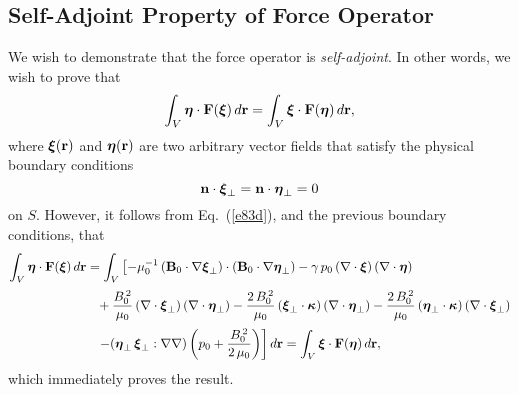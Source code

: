 \documentclass[12pt,prb,aps,notitlepage]{revtex4-1}
\newcommand{\bxi}{\mbox{\boldmath$\xi$}}
\newcommand{\bta}{\mbox{\boldmath$\eta$}}
\newcommand{\bkappa}{\mbox{\boldmath$\kappa$}}
\begin{document}
\subsection{Self-Adjoint Property of Force Operator}
We wish to demonstrate that the force operator is {\em self-adjoint}. In other words, we wish to prove that 
\begin{equation}\label{e26}
\int_V \bta\cdot{\bf F}(\bxi)\,d{\bf r} = \int_V \bxi\cdot {\bf F}(\bta)\,d{\bf r},
\end{equation}
where  $\bxi({\bf r})$ and $\bta({\bf r})$ are two arbitrary vector fields that satisfy the 
physical boundary conditions
\begin{equation}\label{e27}
{\bf n}\cdot\bxi_\perp={\bf n}\cdot\bta_\perp=0
\end{equation}
on $S$.
However, it follows from Eq.~(\ref{e83d}), and the previous boundary conditions, that
 \begin{align}
\int_V \bta\cdot{\bf F}(\bxi)\,d{\bf r} &=\int_V \left[- \mu_0^{-1}\,({\bf B}_0\cdot\nabla\bxi_\perp)\cdot
 ({\bf B}_0\cdot\nabla\bta_\perp)-\gamma\,p_0\,(\nabla\cdot\bxi)\,(\nabla\cdot\bta)
\right.\nonumber\\[0.5ex]
 &\phantom{=}+\frac{B_0^{\,2}}{\mu_0}\,(\nabla\cdot\bxi_\perp)\,(\nabla\cdot\bta_\perp) -\frac{2\,B_0^{\,2}}{\mu_0}\,(\bxi_\perp\cdot\bkappa)\, (\nabla\cdot\bta_\perp)-\frac{2\,B_0^{\,2}}{\mu_0}\,(\bta_\perp\cdot\bkappa)\,(\nabla\cdot\bxi_\perp)\nonumber\\[0.5ex]
 &\phantom{=}\left.
 -(\bta_\perp\,\bxi_\perp : \nabla\nabla)\left(p_0 + \frac{B_0^{\,2}}{2\,\mu_0}\right)\right]d{\bf r}=\int_V \bxi\cdot{\bf F}(\bta)\,d{\bf r},
\end{align}
which immediately proves the result.
\end{document}
